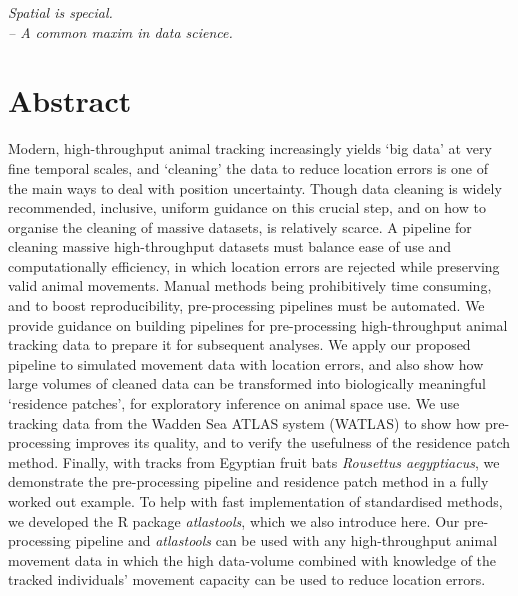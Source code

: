 

\begin{center}
\emph{Spatial is special.\\
\medskip
-- \small{A common maxim in data science.}}
\end{center}

\section*{Abstract}
{
    	
    Modern, high-throughput animal tracking increasingly yields `big data' at very fine temporal scales, and 
    `cleaning' the data to reduce location errors is one of the main ways to deal with position uncertainty. 
    Though data cleaning is widely recommended, inclusive, uniform guidance on this crucial step, and on how to organise the cleaning of massive datasets, is relatively scarce.
    A pipeline for cleaning massive high-throughput datasets must balance ease of use and computationally efficiency, in which location errors are rejected while preserving valid animal movements. 
    Manual methods being prohibitively time consuming, and to boost reproducibility, pre-processing pipelines must be automated.
    We provide guidance on building pipelines for pre-processing high-throughput animal tracking data to prepare it for subsequent analyses. 
    We apply our proposed pipeline to simulated movement data with location errors, and also show how large volumes of cleaned data can be transformed into biologically meaningful `residence patches', for exploratory inference on animal space use. 
    We use tracking data from the Wadden Sea ATLAS system (WATLAS) to show how pre-processing improves its quality, and to verify the usefulness of the residence patch method. 
    Finally, with tracks from Egyptian fruit bats \textit{Rousettus aegyptiacus}, we demonstrate the pre-processing pipeline and residence patch method in a fully worked out example.
    To help with fast implementation of standardised methods, we developed the R package \textit{atlastools}, which we also introduce here. 
    Our pre-processing pipeline and \textit{atlastools} can be used with any high-throughput animal movement data in which the high data-volume combined with knowledge of the tracked individuals’ movement capacity can be used to reduce location errors. 
}

